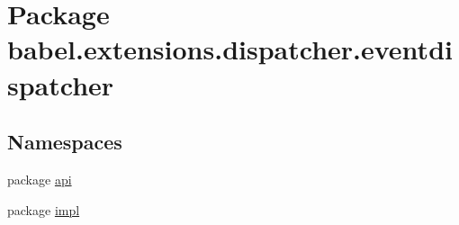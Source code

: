 \hypertarget{namespacebabel_1_1extensions_1_1dispatcher_1_1eventdispatcher}{\section{Package babel.\-extensions.\-dispatcher.\-eventdispatcher}
\label{namespacebabel_1_1extensions_1_1dispatcher_1_1eventdispatcher}
}
\subsection*{Namespaces}
\begin{DoxyCompactItemize}
\item 
package \hyperlink{namespacebabel_1_1extensions_1_1dispatcher_1_1eventdispatcher_1_1api}{api}
\item 
package \hyperlink{namespacebabel_1_1extensions_1_1dispatcher_1_1eventdispatcher_1_1impl}{impl}
\end{DoxyCompactItemize}
